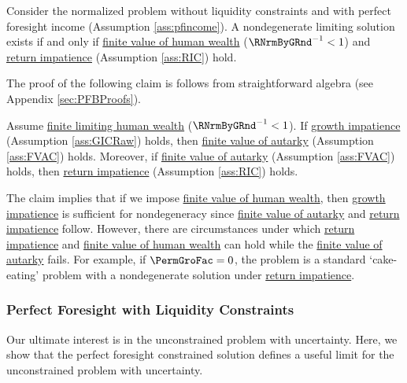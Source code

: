 \documentclass[BufferStockTheory]{subfiles}
\begin{document}
\begin{proposition}\label{prop:pfUCFHWC}
Consider the normalized problem without liquidity constraints and with perfect foresight income (Assumption \ref{ass:pfincome}). A nondegenerate limiting solution exists if and only if \hyperlink{FHWC}{finite value of human wealth} ($\RNrmByGRnd^{-1}<1$) and \hyperlink{RIC}{return impatience} (Assumption \ref{ass:RIC}) hold. 
\end{proposition}

The proof of the following claim is follows from straightforward algebra (see Appendix \ref{sec:PFBProofs}).


\begin{claim}\label{claim:PFConspC}
Assume \hyperlink{FHWC}{finite limiting human wealth} ($\RNrmByGRnd^{-1}<1$). If \hyperlink{GIC}{growth impatience} (Assumption \ref{ass:GICRaw}) holds, then \hyperlink{FVAC}{finite value of autarky} (Assumption \ref{ass:FVAC}) holds. Moreover, if \hyperlink{FVAC}{finite value of autarky} (Assumption \ref{ass:FVAC}) holds, then \hyperlink{RIC}{return impatience} (Assumption \ref{ass:RIC}) holds. 
\end{claim}



The claim implies that if we impose \hyperlink{FHWC}{finite value of human wealth}, then  \hyperlink{GIC}{growth impatience} is sufficient for nondegeneracy since \hyperlink{FVAC}{finite value of autarky} and \hyperlink{RIC}{return impatience} follow.
However, there are circumstances under which \hyperlink{RIC}{return impatience} and \hyperlink{FHWC}{finite value of human wealth} can hold while the \hyperlink{FVAC}{finite value of autarky} fails.
For example, if $\PermGroFac=0$, the problem is a standard `cake-eating' problem with a nondegenerate solution under \hyperlink{RIC}{return impatience}.%

\subsubsection{Perfect Foresight with Liquidity Constraints}

Our ultimate interest is in the unconstrained problem with uncertainty.
Here, we show that the perfect foresight constrained solution defines a useful limit for the unconstrained problem with uncertainty.
\end{document}
